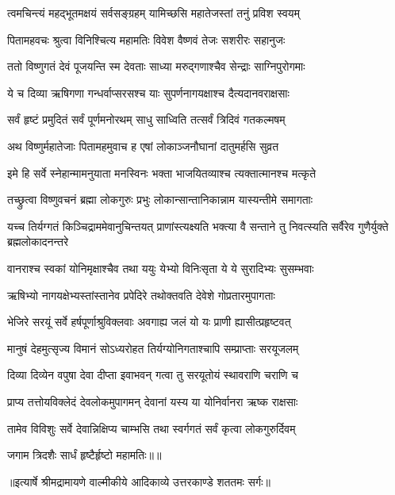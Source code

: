 \twolineshloka
{त्वमचिन्त्यं महद्भूतमक्षयं सर्वसङ्ग्रहम्}
{यामिच्छसि महातेजस्तां तनुं प्रविश स्वयम्} %

\twolineshloka
{पितामहवचः श्रुत्वा विनिश्चित्य महामतिः}
{विवेश वैष्णवं तेजः सशरीरः सहानुजः} %

\twolineshloka
{ततो विष्णुगतं देवं पूजयन्ति स्म देवताः}
{साध्या मरुद्गणाश्चैव सेन्द्राः साग्निपुरोगमाः} %

\twolineshloka
{ये च दिव्या ऋषिगणा गन्धर्वाप्सरसश्च याः}
{सुपर्णनागयक्षाश्च दैत्यदानवराक्षसाः} %

\twolineshloka
{सर्वं हृष्टं प्रमुदितं सर्वं पूर्णमनोरथम्}
{साधु साध्विति तत्सर्वं त्रिदिवं गतकल्मषम्} %

\twolineshloka
{अथ विष्णुर्महातेजाः पितामहमुवाच ह}
{एषां लोकाञ्जनौघानां दातुमर्हसि सुव्रत} %

\twolineshloka
{इमे हि सर्वे स्नेहान्मामनुयाता मनस्विनः}
{भक्ता भाजयितव्याश्च त्यक्तात्मानश्च मत्कृते} %

\twolineshloka
{तच्छ्रुत्वा विष्णुवचनं ब्रह्मा लोकगुरुः प्रभुः}
{लोकान्सान्तानिकान्नाम यास्यन्तीमे समागताः} %

\threelineshloka
{यच्च तिर्यग्गतं किञ्चिद्राममेवानुचिन्तयत्}
{प्राणांस्त्यक्ष्यति भक्त्या वै सन्ताने तु निवत्स्यति}
{सर्वैरेव गुणैर्युक्ते ब्रह्मलोकादनन्तरे} %

\twolineshloka
{वानराश्च स्वकां योनिमृक्षाश्चैव तथा ययुः}
{येभ्यो विनिःसृता ये ये सुरादिभ्यः सुसम्भवाः} %

\twolineshloka
{ऋषिभ्यो नागयक्षेभ्यस्तांस्तानेव प्रपेदिरे}
{तथोक्तवति देवेशे गोप्रतारमुपागताः} %

\twolineshloka
{भेजिरे सरयूं सर्वे हर्षपूर्णाश्रुविक्लवाः}
{अवगाह्य जलं यो यः प्राणी ह्यासीत्प्रहृष्टवत्} %

\twolineshloka
{मानुषं देहमुत्सृज्य विमानं सोऽध्यरोहत}
{तिर्यग्योनिगताश्चापि सम्प्राप्ताः सरयूजलम्} %

\twolineshloka
{दिव्या दिव्येन वपुषा देवा दीप्ता इवाभवन्}
{गत्वा तु सरयूतोयं स्थावराणि चराणि च} %

\twolineshloka
{प्राप्य तत्तोयविक्लेदं देवलोकमुपागमन्}
{देवानां यस्य या योनिर्वानरा ऋष्क राक्षसाः} %

\twolineshloka
{तामेव विविशुः सर्वे देवान्निक्षिप्य चाम्भसि}
{तथा स्वर्गगतं सर्वं कृत्वा लोकगुरुर्दिवम्} %

{जगाम त्रिदशैः सार्धं हृष्टैर्हृष्टो महामतिः॥॥} %

\addtocounter{shlokacount}{1}


{॥इत्यार्षे श्रीमद्रामायणे वाल्मीकीये आदिकाव्ये उत्तरकाण्डे शततमः सर्गः॥}

